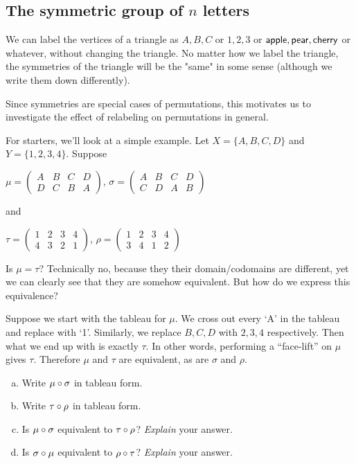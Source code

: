 \subsection{The symmetric group of $n$ letters}

We can label the vertices of a triangle as $A, B, C$ or $1, 2, 3$ or $\sf{apple, pear, cherry}$ or whatever, without changing the triangle. No matter how we label the triangle, the symmetries of the triangle will be the "same" in some sense (although we write them down differently). 

Since symmetries are special cases of permutations, this motivates us to investigate the effect of relabeling on permutations in general.

For starters, we'll look at a simple example. Let $X = \{A, B, C, D\}$ and $Y = \{1, 2, 3, 4\}$.  Suppose 

\begin{center}
$\mu = \begin{pmatrix} A & B & C & D\\ D & C & B & A \end{pmatrix}$, $\sigma = \begin{pmatrix} A & B & C & D\\ C & D & A & B \end{pmatrix}$ 

\medskip
and 

$\tau = \begin{pmatrix} 1 & 2 & 3 & 4\\ 4 & 3 & 2 & 1 \end{pmatrix}$, $\rho = \begin{pmatrix} 1 & 2 & 3 & 4\\ 3 & 4 & 1 & 2 \end{pmatrix}$ \\ 
\end{center}

\noindent
Is $\mu = \tau$?  Technically no,  because they their domain/codomains are different, yet we can clearly see that they are somehow equivalent.  But how do we express this equivalence?

Suppose we start with the tableau for $\mu$. We cross out every `A' in the tableau and replace with `1'. Similarly, we replace $B, C, D$ with $2, 3,4$ respectively. Then what we end up with is exactly $\tau$.  In other words, performing a ``face-lift''  on $\mu$ gives $\tau$.  Therefore $\mu$ and $\tau$ are equivalent, as are $\sigma$ and $\rho$.  

\begin{exercise}{7}
\begin{enumerate}[(a)]
\item
Write $\mu \circ \sigma$ in tableau form.
\item
Write $\tau \circ \rho$ in tableau form.
\item
Is $ \mu \circ \sigma$ equivalent to $\tau \circ \rho$? \emph{Explain} your answer.
\item
Is $\sigma \circ \mu$ equivalent to $\rho \circ \tau$?  \emph{Explain} your answer.
\end{enumerate}
\end{exercise}

